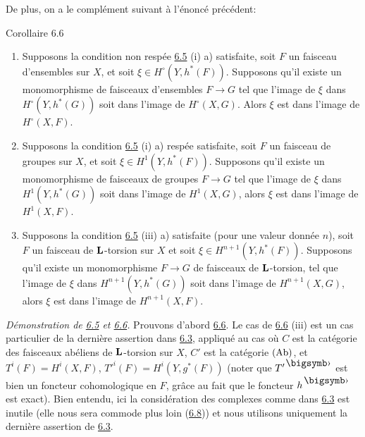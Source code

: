 \documentclass[10pt]{../fichiers-configuration-latex/smfart}
\begin{document}
De plus, on a le complément suivant à l'énoncé précédent:

\begin{enonce*}{Corollaire 6.6}
\begin{enumerate}
\renewcommand{\theenumi}{\roman{enumi}}
\renewcommand{\labelenumi}{(\theenumi)}
\item Supposons la condition non respée \hyperref[XII.prop6.5]{6.5} {\rm (i) a)} satisfaite,
soit $F$ un faisceau d'ensembles sur $X$, et soit $\xi\in
H^{\circ}(Y,h^{\ast}(F))$. Supposons qu'il\pageoriginale 
existe un monomorphisme de
faisceaux d'ensembles $F\rightarrow G$ tel que l'image de $\xi$ dans
$H^{\circ}(Y,h^{\ast}(G))$ soit dans l'image de
$H^{\circ}(X,G)$. Alors $\xi$ est dans l'image de $H^{\circ}(X,F)$.

\item Supposons la condition {\rm \hyperref[XII.prop6.5]{6.5} (i) a)} respée satisfaite, soit
$F$ un faisceau de groupes sur $X$, et soit $\xi\in
H^1(Y,h^{\ast}(F))$. Supposons qu'il existe un monomorphisme de
faisceaux de groupes $F\rightarrow G$ tel que l'image de $\xi$ dans
$H^1(Y,h^{\ast}(G))$ soit dans l'image de $H^1(X,G)$, alors $\xi$ est
dans l'image de $H^1(X,F)$.

\item Supposons la condition {\rm \hyperref[XII.prop6.5]{6.5} (iii) a)} satisfaite (pour une
valeur donnée $n$), soit $F$ un faisceau de $\mathbf{L}$-torsion sur
$X$ et soit $\xi\in H^{n+1}(Y,h^{\ast}(F))$. Supposons qu'il existe
un monomorphisme $F\rightarrow G$ de faisceaux de
$\mathbf{L}$-torsion, tel que l'image de $\xi$ dans $H^{n+1}
(Y,h^{\ast}(G))$ soit dans l'image de $H^{n+1}(X,G)$, alors $\xi$
est dans l'image de $H^{n+1}(X,F)$.
\end{enumerate}
\end{enonce*}

\noindent
\emph{Démonstration de \hyperref[XII.prop6.5]{6.5} et \hyperref[XII.cor6.6]{6.6}.} 
Prouvons d'abord \hyperref[XII.cor6.6]{6.6}. Le cas
de \hyperref[XII.cor6.6]{6.6} (iii) est un cas particulier de la dernière assertion dans \hyperref[XII.cor6.3]{6.3},
appliqué au cas où $C$ est la catégorie des faisceaux abéliens de
$\mathbf{L}$-torsion sur $X$, $C'$ est la catégorie $(\operatorname{Ab})$, et
$T^{i}(F)=H^{i}(X,F)$, ${T'}^{i}(F)=H^{i}(Y,g^{\ast}(F))$ (noter que
$T'^{\bigdot}$ est bien un foncteur cohomologique en $F$, grâce au
fait que le foncteur $h^{\bigdot}$ est exact). Bien entendu, ici la
considération des complexes comme dans \hyperref[XII.cor6.3]{6.3} est inutile (elle nous sera
commode plus loin (\hyperref[XII.prop6.8]{6.8})) et nous utilisons uniquement la dernière
assertion de \hyperref[XII.cor6.3]{6.3}.
\end{document}
